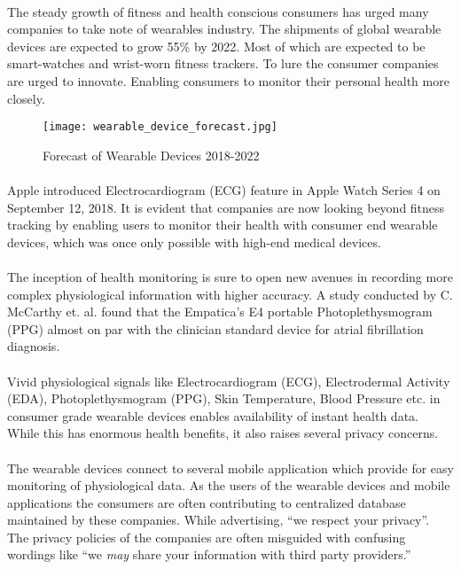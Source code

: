 \paragraph{}
The steady growth of fitness and health conscious consumers has urged many companies to take note of wearables industry. The shipments of global wearable devices are expected to grow 55\% by 2022.\cite{WearableStudy} Most of which are expected to be smart-watches and wrist-worn fitness trackers. To lure the consumer companies are urged to innovate. Enabling consumers to monitor their personal health more closely.
\begin{figure}
	\centering
	\texttt{[image: wearable\_device\_forecast.jpg]}
	\caption{Forecast of Wearable Devices 2018-2022}
	\label{fig:forecast_of_wearable_devices}
\end{figure}
\paragraph{}
Apple introduced Electrocardiogram (ECG) feature in Apple Watch Series 4 on September 12, 2018. It is evident that companies are now looking beyond fitness tracking by enabling users to monitor their health with consumer end wearable devices, which was once only possible with high-end medical devices.
\paragraph{}
The inception of health monitoring is sure to open new avenues in recording more complex physiological information with higher accuracy. A study conducted by C. McCarthy et. al. found that the Empatica's E4 portable Photoplethysmogram (PPG) almost on par with the clinician standard device for atrial fibrillation diagnosis. \cite{7508621}
\paragraph{}
Vivid physiological signals like Electrocardiogram (ECG), Electrodermal Activity (EDA), Photoplethysmogram (PPG), Skin Temperature, Blood Pressure etc. in consumer grade wearable devices enables availability of instant health data. While this has enormous health benefits, it also raises several privacy concerns.
\paragraph{}
The wearable devices connect to several mobile application which provide for easy monitoring of physiological data. As the users of the wearable devices and mobile applications the consumers are often contributing to centralized database maintained by these companies. While advertising, “we respect your privacy”. The privacy policies of the companies are often misguided with confusing wordings like “we \textit{may} share your information with third party providers.”
